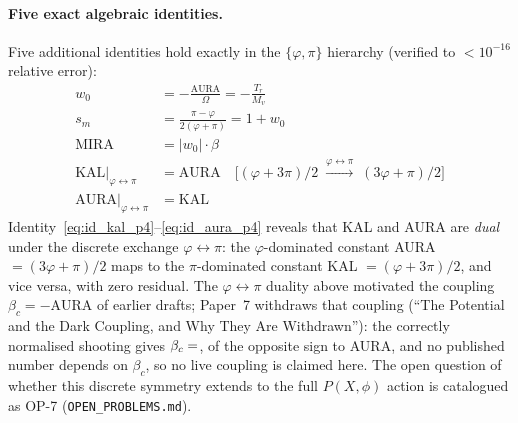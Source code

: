 \documentclass[12pt,a4paper]{article}
\begin{document}
\paragraph{Five exact algebraic identities.}
Five additional identities hold exactly in the $\{\varphi,\pi\}$ hierarchy
(verified to $<10^{-16}$ relative error):
\begin{align}
  w_0 &= -\frac{\mathrm{AURA}}{\Omega}
       = -\frac{T_r}{M_v} \label{eq:id_w0_p4} \\
  s_m &= \frac{\pi-\varphi}{2(\varphi+\pi)}
       = 1 + w_0 \label{eq:id_sm_p4} \\
  \mathrm{MIRA} &= |w_0|\cdot\beta \label{eq:id_mira_p4} \\
  \mathrm{KAL}\big|_{\varphi\leftrightarrow\pi} &= \mathrm{AURA}
       \quad\bigl[(\varphi+3\pi)/2\;\xrightarrow{\varphi\leftrightarrow\pi}\;(3\varphi+\pi)/2\bigr]
       \label{eq:id_kal_p4} \\
  \mathrm{AURA}\big|_{\varphi\leftrightarrow\pi} &= \mathrm{KAL}
       \label{eq:id_aura_p4}
\end{align}
Identity~\eqref{eq:id_kal_p4}--\eqref{eq:id_aura_p4} reveals that KAL and AURA are
\emph{dual} under the discrete exchange $\varphi\leftrightarrow\pi$: the
$\varphi$-dominated constant AURA $=(3\varphi+\pi)/2$ maps to the
$\pi$-dominated constant KAL $=(\varphi+3\pi)/2$, and vice versa, with
zero residual.  The $\varphi\leftrightarrow\pi$ duality above motivated the
coupling $\beta_c=-\mathrm{AURA}$ of earlier drafts; Paper~7
withdraws that coupling (``The Potential and the Dark Coupling, and Why
They Are Withdrawn''): the correctly normalised shooting gives
$\beta_c=\val{p7_beta_c_ok}$, of the opposite sign to AURA, and no published
number depends on $\beta_c$, so no
live coupling is claimed here.
The open question of whether this discrete symmetry extends to the full
$P(X,\phi)$ action is catalogued as OP-7 (\texttt{OPEN\_PROBLEMS.md}).

\clearpage


\end{document}
